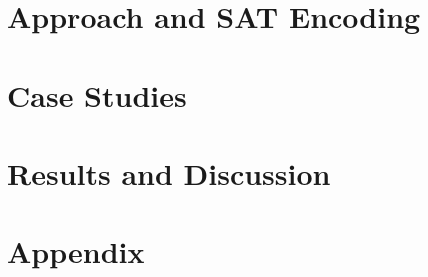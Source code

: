 \documentclass[sigconf]{acmart}
\begin{document}
\section{Approach and SAT Encoding}

%
\section{Case Studies}

%
\section{Results and Discussion}







\appendix
\section{Appendix}%
\label{appendix:source-code-listings}

\end{document}
